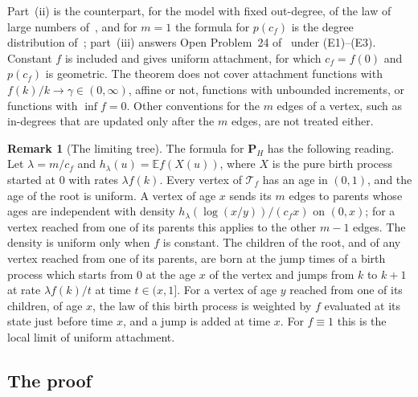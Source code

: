 \documentclass[11pt]{amsart}
\theoremstyle{definition}
\newtheorem{remark}[theorem]{Remark}
\newcommand{\E}{\mathbb{E}}
\newcommand{\cT}{\mathcal{T}}
\begin{document}
Part~\textup{(ii)} is the counterpart, for the model with fixed out-degree, of the law of large numbers
of~\cite{CSV}, and for $m=1$ the formula for $p(c_f)$ is the degree distribution of~\cite{KRL,RTV};
part~\textup{(iii)}
answers Open Problem~24 of~\cite{Aletti} under \textup{(E1)--(E3)}.
Constant $f$ is included and gives uniform attachment, for which $c_f=f(0)$ and $p(c_f)$ is geometric. The
theorem does not cover attachment functions with $f(k)/k\to\gamma\in(0,\infty)$, affine or not, functions with
unbounded increments, or functions with $\inf f=0$. Other conventions for the $m$
edges of a vertex, such as in-degrees that are updated only after the $m$ edges, are not treated either.

\begin{remark}[The limiting tree]\label{rem:tree}
The formula for $\mathbf P_H$ has the following reading. Let $\lambda=m/c_f$ and $h_\lambda(u)=\E f(X(u))$, where
$X$ is the pure birth process started at $0$ with rates $\lambda f(k)$. Every vertex of $\cT_f$ has an age in
$(0,1)$, and the age of the root is uniform. A vertex of age $x$ sends its $m$ edges to parents whose ages are
independent with density $h_\lambda(\log(x/y))/(c_fx)$ on $(0,x)$; for a vertex reached from one of its parents
this applies to the other $m-1$ edges. The density is uniform only when $f$ is constant. The children of the root, and of any vertex reached from one of its parents, are born at the jump
times of a birth process which starts from $0$ at the age $x$ of the vertex and jumps from $k$ to $k+1$ at rate
$\lambda f(k)/t$ at time $t\in(x,1]$. For a vertex of age $y$ reached from one of its children, of age $x$, the
law of this birth process is weighted by $f$ evaluated at its state just before time $x$, and a jump is added at
time $x$. For $f\equiv1$ this is the local limit of uniform attachment.
\end{remark}

\subsection{The proof}
\end{document}

